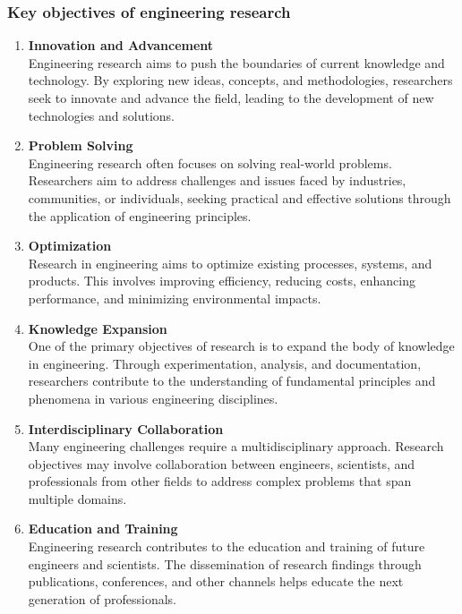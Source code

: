 \documentclass{article}
\begin{document}
	\subsubsection{Key objectives of engineering research}
	\begin{enumerate}[label=\textbf{\roman*)}]
		\item \textbf{Innovation and Advancement} \\
		Engineering research aims to push the boundaries of current knowledge and technology.
		By exploring new ideas, concepts, and methodologies, researchers seek to innovate and advance the
		field, leading to the development of new technologies and solutions.

		\item \textbf{Problem Solving} \\
		Engineering research often focuses on solving real-world problems.
		Researchers aim to address challenges and issues faced by industries, communities, or individuals,
		seeking practical and effective solutions through the application of engineering principles.

		\item \textbf{Optimization} \\
		Research in engineering aims to optimize existing processes, systems, and products.
		This involves improving efficiency, reducing costs, enhancing performance, and minimizing
		environmental impacts.

		\item \textbf{Knowledge Expansion} \\
		One of the primary objectives of research is to expand the body of knowledge in engineering.
		Through experimentation, analysis, and documentation, researchers contribute to the understanding of
		fundamental principles and phenomena in various engineering disciplines.

		\item \textbf{Interdisciplinary Collaboration} \\
		Many engineering challenges require a multidisciplinary approach.
		Research objectives may involve collaboration between engineers, scientists, and professionals from
		other fields to address complex problems that span multiple domains.

		\item \textbf{Education and Training} \\
		Engineering research contributes to the education and training of future engineers and scientists.
		The dissemination of research findings through publications, conferences, and other channels helps
		educate the next generation of professionals.


\end{enumerate}
\end{document}
